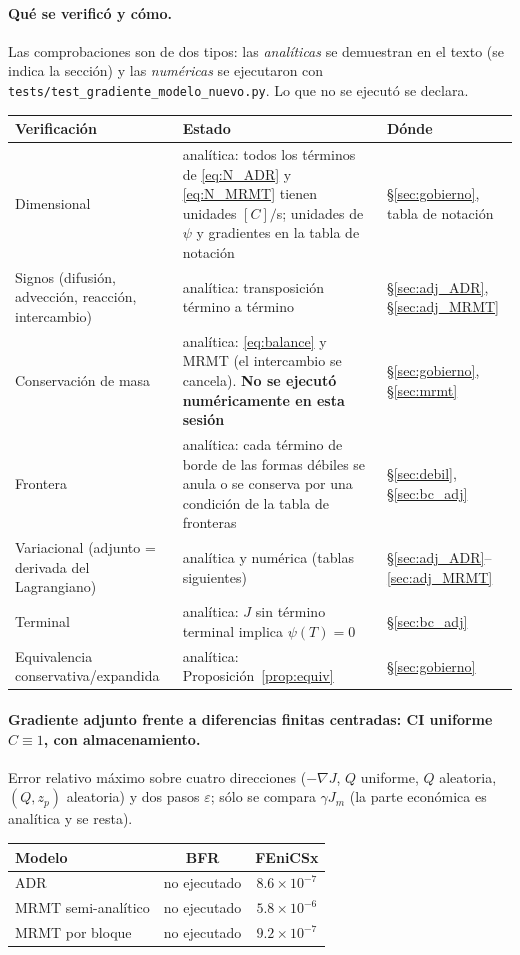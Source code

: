 \paragraph{Qu\'e se verific\'o y c\'omo.} Las comprobaciones son de dos tipos: las \emph{anal\'iticas} se
demuestran en el texto (se indica la secci\'on) y las \emph{num\'ericas} se ejecutaron con
\texttt{tests/test\_gradiente\_modelo\_nuevo.py}. Lo que no se ejecut\'o se declara.

\begin{center}\small
\begin{tabular}{p{3.6cm}p{6.6cm}p{4.2cm}}
\toprule
Verificaci\'on & Estado & D\'onde\\
\midrule
Dimensional & anal\'itica: todos los t\'erminos de \eqref{eq:N_ADR} y \eqref{eq:N_MRMT} tienen unidades $[C]/$s; unidades de $\psi$ y gradientes en la tabla de notaci\'on & \S\ref{sec:gobierno}, tabla de notaci\'on\\
Signos (difusi\'on, advecci\'on, reacci\'on, intercambio) & anal\'itica: transposici\'on t\'ermino a t\'ermino & \S\ref{sec:adj_ADR}, \S\ref{sec:adj_MRMT}\\
Conservaci\'on de masa & anal\'itica: \eqref{eq:balance} y MRMT (el intercambio se cancela). \textbf{No se ejecut\'o num\'ericamente en esta sesi\'on} & \S\ref{sec:gobierno}, \S\ref{sec:mrmt}\\
Frontera & anal\'itica: cada t\'ermino de borde de las formas d\'ebiles se anula o se conserva por una condici\'on de la tabla de fronteras & \S\ref{sec:debil}, \S\ref{sec:bc_adj}\\
Variacional (adjunto = derivada del Lagrangiano) & anal\'itica y num\'erica (tablas siguientes) & \S\ref{sec:adj_ADR}--\ref{sec:adj_MRMT}\\
Terminal & anal\'itica: $J$ sin t\'ermino terminal implica $\psi(T)=0$ & \S\ref{sec:bc_adj}\\
Equivalencia conservativa/expandida & anal\'itica: Proposici\'on~\ref{prop:equiv} & \S\ref{sec:gobierno}\\
\bottomrule
\end{tabular}
\end{center}

\paragraph{Gradiente adjunto frente a diferencias finitas centradas: CI uniforme $C\equiv1$, con almacenamiento.}
Error relativo m\'aximo sobre cuatro direcciones ($-\nabla J$, $Q$ uniforme, $Q$ aleatoria, $(Q,z_p)$ aleatoria) y dos pasos $\varepsilon$; s\'olo se compara $\gamma J_m$ (la parte econ\'omica es anal\'itica y se resta).
\begin{center}\small\begin{tabular}{lcc}\toprule Modelo & BFR & FEniCSx\\\midrule
ADR & no ejecutado & $8.6\times10^{-7}$\\
MRMT semi-anal\'itico & no ejecutado & $5.8\times10^{-6}$\\
MRMT por bloque & no ejecutado & $9.2\times10^{-7}$\\
\bottomrule\end{tabular}\end{center}
